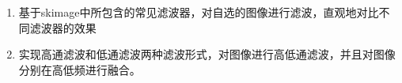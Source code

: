\begin{enumerate}
	\item 基于skimage中所包含的常见滤波器，对自选的图像进行滤波，直观地对比不同滤波器的效果
	\item 实现高通滤波和低通滤波两种滤波形式，对图像进行高低通滤波，并且对图像分别在高低频进行融合。
\end{enumerate}